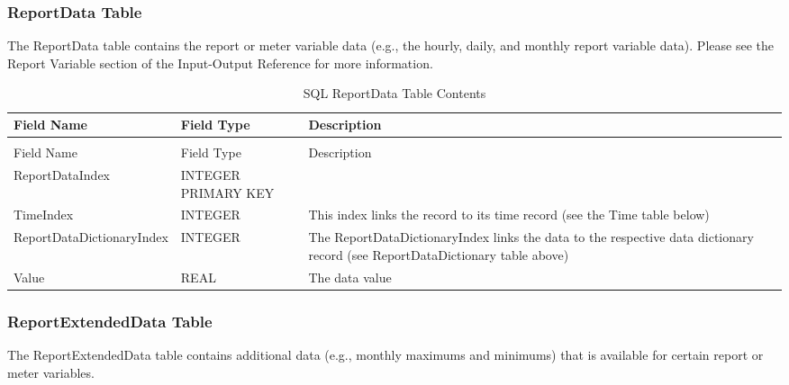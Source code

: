 \subsubsection{ReportData Table}

The ReportData table contains the report or meter variable data (e.g., the hourly, daily, and monthly report variable data). Please see the Report Variable section of the Input-Output Reference for more information.

{\scriptsize
\begin{longtable}[c]{>{\raggedright}p{1.5in}>{\raggedright}p{1.5in}>{\raggedright}p{3.0in}}
\caption{SQL ReportData Table Contents \label{table:table-8.-sql-reportdata-table-contents}} \tabularnewline
\toprule 
Field Name & Field Type & Description \tabularnewline
\midrule
\endfirsthead

\caption[]{SQL ReportData Table Contents} \tabularnewline
\toprule 
Field Name & Field Type & Description \tabularnewline
\midrule
\endhead

ReportDataIndex & INTEGER PRIMARY KEY &  \tabularnewline
TimeIndex & INTEGER & This index links the record to its time record (see the Time table below) \tabularnewline
ReportData\-Dictionary\-Index & INTEGER & The ReportDataDictionaryIndex links the data to the respective data dictionary record (see ReportDataDictionary table above) \tabularnewline
Value & REAL & The data value \tabularnewline
\bottomrule
\end{longtable}}

\subsubsection{ReportExtendedData Table}

The ReportExtendedData table contains additional data (e.g., monthly maximums and minimums) that is available for certain report or meter variables.

